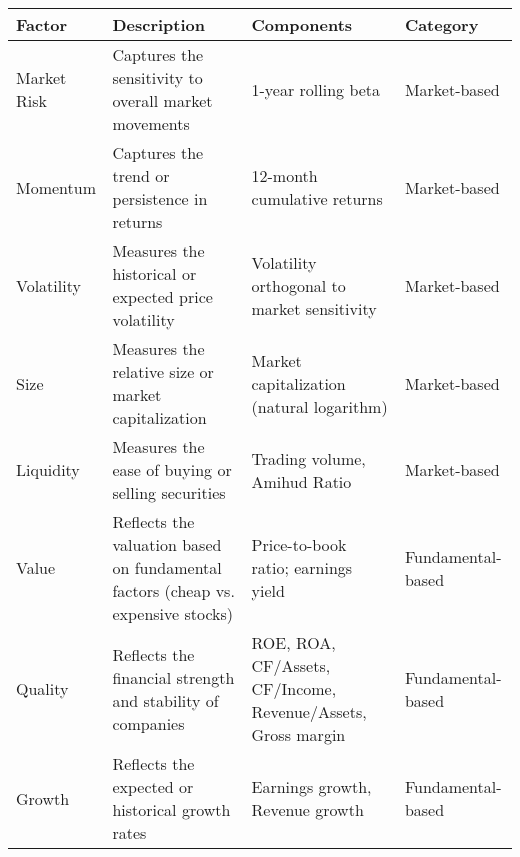 \begin{tabular}{|l|p{5cm}|p{4cm}|p{3cm}|}
    \hline
    \rowcolor{LGray}
    \textbf{Factor} & \textbf{Description} & \textbf{Components} & \textbf{Category} \\
    \hline\hline
    Market Risk & Captures the sensitivity to overall market movements & 1-year rolling beta & Market-based \\
    \hline
    Momentum & Captures the trend or persistence in returns & 12-month cumulative returns & Market-based \\
    \hline
    Volatility & Measures the historical or expected price volatility & Volatility orthogonal to market sensitivity & Market-based \\
    \hline
    Size & Measures the relative size or market capitalization & Market capitalization (natural logarithm) & Market-based \\
    \hline
    Liquidity & Measures the ease of buying or selling securities & Trading volume, Amihud Ratio & Market-based \\
    \hline
    Value & Reflects the valuation based on fundamental factors (cheap vs. expensive stocks) & Price-to-book ratio; earnings yield & Fundamental-based \\
    \hline
    Quality & Reflects the financial strength and stability of companies & ROE, ROA, CF/Assets, CF/Income, Revenue/Assets, Gross margin & Fundamental-based \\
    \hline
    Growth & Reflects the expected or historical growth rates & Earnings growth, Revenue growth  & Fundamental-based \\
    \hline
\end{tabular}